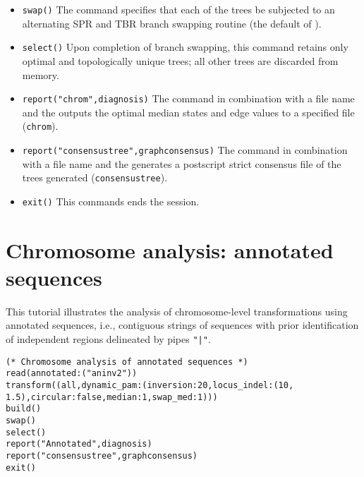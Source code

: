 \begin{itemize}
\item \texttt{swap()} The  command specifies that each of the trees be subjected to an alternating SPR and TBR branch swapping routine (the default of \poy).
\item \texttt{select()} Upon completion of branch swapping, this command retains only optimal and topologically unique trees; all other trees are discarded from memory. 
\item \texttt{report("chrom",diagnosis)}  The  command in combination with a file name and the  outputs the optimal median states and edge values to a specified file (\texttt{chrom}). 
\item \texttt{report("consensustree",graphconsensus)}  The  command in combination with a file name and the  generates a postscript strict consensus file of the trees generated (\texttt{consensustree}). 
\item \texttt{exit()} This commands ends the \poy session.
\end{itemize}

\section{Chromosome analysis: annotated sequences}{\label{tutorial 7}}

This tutorial illustrates the analysis of chromosome-level transformations using 
annotated sequences, i.e., contiguous strings of sequences with prior 
identification of independent regions delineated by pipes  \texttt{"|"}. 

\begin{verbatim}
(* Chromosome analysis of annotated sequences *)
read(annotated:("aninv2"))
transform((all,dynamic_pam:(inversion:20,locus_indel:(10,
1.5),circular:false,median:1,swap_med:1)))
build()
swap()
select()
report("Annotated",diagnosis)
report("consensustree",graphconsensus)
exit()
\end{verbatim}

